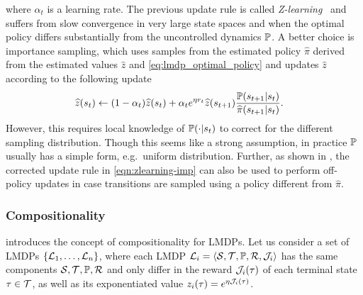 where $\alpha_t$ is a learning rate. 
The previous update rule is called \emph{Z-learning}~\citep{Todorov2006} and suffers from slow convergence in very large state spaces and when the optimal policy differs substantially from the uncontrolled dynamics $\mathbb{P}$.
A better choice is importance sampling, which uses samples from the estimated policy $\widehat{\pi}$ derived from the estimated values $\widehat{z}$ and \eqref{eq:lmdp_optimal_policy} and updates $\widehat{z}$ according to the following update
\begin{align}\label{eqn:zlearning-imp}
\widehat{z}(s_t) \leftarrow (1-\alpha_t)& \widehat{z}(s_t) + \alpha_t e^{\eta r_t}\widehat{z}(s_{t+1})\frac {\mathbb{P}(s_{t+1}|s_t)} {\widehat{\pi}(s_{t+1}|s_t)}.
\end{align}
However, this requires local knowledge of $\mathbb{P}(\cdot|s_t)$ to correct for the different sampling distribution.
Though this seems like a strong assumption, in practice $\mathbb{P}$ usually has a simple form, e.g.~uniform distribution.
Further, as shown in \citet{Jonsson2016}, the corrected update rule in \eqref{eqn:zlearning-imp} can also be used to perform off-policy updates in case transitions are sampled using a policy different from $\widehat{\pi}$.

\subsubsection{Compositionality}
\label{section:compositionality}
\citet{Todorov2009a} introduces the concept of compositionality for LMDPs. Let us consider a set of LMDPs $\{\mathcal{L}_1,\ldots,\mathcal{L}_n\}$, where each LMDP $\mathcal{L}_i=\langle\mathcal{S},\mathcal{T},\mathbb{P},\mathcal{R},\mathcal{J}_i\rangle$ has the same components $\mathcal{S},\mathcal{T},\mathbb{P},\mathcal{R}$ and only differ in the reward $\mathcal{J}_i(\tau)$ of each terminal state $\tau\in\mathcal{T}$, as well as its exponentiated value $z_i(\tau)=e^{\eta \mathcal{J}_i(\tau)}$.

